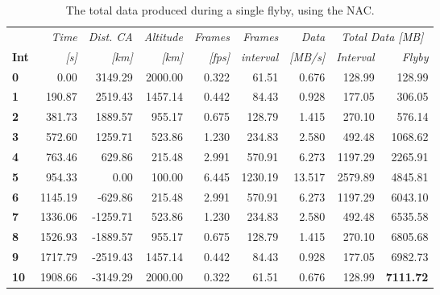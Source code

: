 \begin{table}[h!]
  \centering
    \begin{tabular}{l|r|r|r|r|r|r|r|r|}
      & \textit{Time} & \textit{Dist. CA} & \textit{Altitude} & \multicolumn{1}{c|}{\textit{Frames}} & \textit{Frames} & \textit{Data} & \multicolumn{2}{c}{\textit{Total Data [MB]}} \\
\textbf{Int} & \textit{[s]} & \textit{[km]} & \textit{[km]} & \textit{[fps]} & \textit{interval} & \textit{[MB/s]} & \textit{Interval} & \multicolumn{1}{r}{\textit{Flyby}} \bigstrut[b]\\
\hline
\textbf{0} & 0.00  & 3149.29 & 2000.00 & 0.322 & 61.51 & 0.676 & 128.99 & 128.99 \bigstrut[t]\\
\textbf{1} & 190.87 & 2519.43 & 1457.14 & 0.442 & 84.43 & 0.928 & 177.05 & 306.05 \\
\textbf{2} & 381.73 & 1889.57 & 955.17 & 0.675 & 128.79 & 1.415 & 270.10 & 576.14 \\
\textbf{3} & 572.60 & 1259.71 & 523.86 & 1.230 & 234.83 & 2.580 & 492.48 & 1068.62 \\
\textbf{4} & 763.46 & 629.86 & 215.48 & 2.991 & 570.91 & 6.273 & 1197.29 & 2265.91 \\
\textbf{5} & 954.33 & 0.00  & 100.00 & 6.445 & 1230.19 & 13.517 & 2579.89 & 4845.81 \\
\textbf{6} & 1145.19 & -629.86 & 215.48 & 2.991 & 570.91 & 6.273 & 1197.29 & 6043.10 \\
\textbf{7} & 1336.06 & -1259.71 & 523.86 & 1.230 & 234.83 & 2.580 & 492.48 & 6535.58 \\
\textbf{8} & 1526.93 & -1889.57 & 955.17 & 0.675 & 128.79 & 1.415 & 270.10 & 6805.68 \\
\textbf{9} & 1717.79 & -2519.43 & 1457.14 & 0.442 & 84.43 & 0.928 & 177.05 & 6982.73 \\
\textbf{10} & 1908.66 & -3149.29 & 2000.00 & 0.322 & 61.51 & 0.676 & 128.99 & \textbf{7111.72} \\
\end{tabular}%
  \caption{The total data produced during a single flyby, using the NAC.}
  \label{tab:nac_flyby_data}%
\end{table}%
